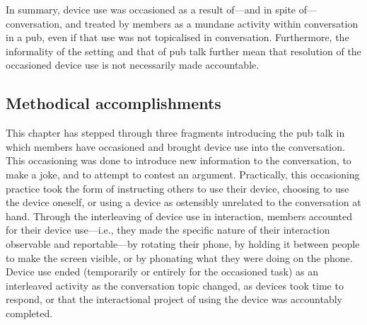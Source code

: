 \begin{revisedsubmission}
In summary, device use was occasioned as a result of---and in spite of---conversation, and treated by members as a mundane activity within conversation in a pub, even if that use was not topicalised in conversation.
Furthermore, the informality of the setting and that of pub talk further mean that resolution of the occasioned device use is not necessarily made accountable.
\end{revisedsubmission}






\subsection{Methodical accomplishments}\label{sec:empirical pub summary methods}
\begin{revisedsubmission}
This chapter has stepped through three fragments introducing the pub talk in which members have occasioned and brought device use into the conversation.
This occasioning was done to introduce new information to the conversation, to make a joke, and to attempt to contest an argument.
Practically, this occasioning practice took the form of instructing others to use their device, choosing to use the device oneself, or using a device as ostensibly unrelated to the conversation at hand.
Through the interleaving of device use in interaction, members accounted for their device use---i.e., they made the specific nature of their interaction observable and reportable---by rotating their phone, by holding it between people to make the screen visible, or by phonating what they were doing on the phone.
Device use ended (temporarily or entirely for the occasioned task) as an interleaved activity as the conversation topic changed, as devices took time to respond, or that the interactional project of using the device was accountably completed.
\end{revisedsubmission}







